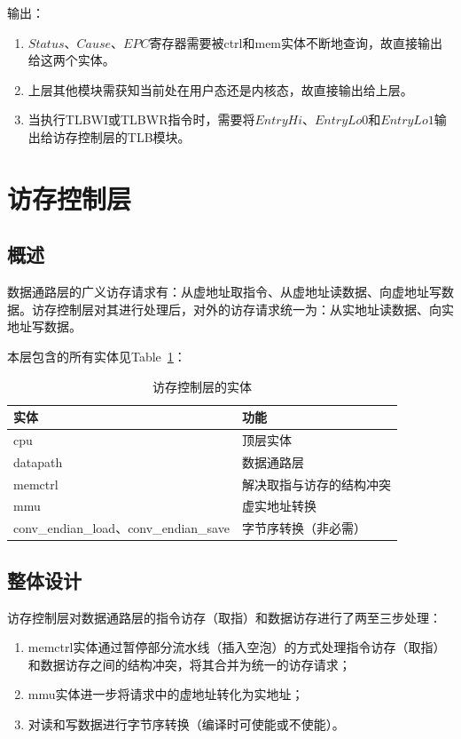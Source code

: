 \documentclass{article}
\begin{document}
\begin{spacing}{1.4}
输出：
\begin{enumerate}
    \item $Status$、$Cause$、$EPC$寄存器需要被ctrl和mem实体不断地查询，故直接输出给这两个实体。
    \item 上层其他模块需获知当前处在用户态还是内核态，故直接输出给上层。
    \item 当执行TLBWI或TLBWR指令时，需要将$EntryHi$、$EntryLo0$和$EntryLo1$输出给访存控制层的TLB模块。
\end{enumerate}

\section{访存控制层}

\subsection{概述}

数据通路层的广义访存请求有：从虚地址取指令、从虚地址读数据、向虚地址写数据。访存控制层对其进行处理后，对外的访存请求统一为：从实地址读数据、向实地址写数据。

本层包含的所有实体见Table~\ref{tb:mem-entities}：

\begin{table}[!htb]
\begin{center}
\begin{tabular}{p{7.5cm}|p{7.5cm}}  
\hline  
\textbf{实体}&\textbf{功能} \\
\hline cpu & 顶层实体 \\
\hline datapath & 数据通路层 \\
\hline memctrl & 解决取指与访存的结构冲突 \\
\hline mmu & 虚实地址转换 \\
\hline conv\_endian\_load、conv\_endian\_save & 字节序转换（非必需） \\
\hline 
\end{tabular}  
\caption{访存控制层的实体}
\label{tb:mem-entities}
\end{center}
\end{table}

\subsection{整体设计}

访存控制层对数据通路层的指令访存（取指）和数据访存进行了两至三步处理：

\begin{enumerate}
    \item memctrl实体通过暂停部分流水线（插入空泡）的方式处理指令访存（取指）和数据访存之间的结构冲突，将其合并为统一的访存请求；
    \item mmu实体进一步将请求中的虚地址转化为实地址；
    \item 对读和写数据进行字节序转换（编译时可使能或不使能）。
\end{enumerate}


\end{spacing}
\end{document}
